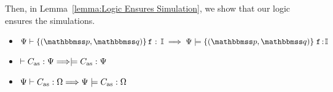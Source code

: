 
Then, in Lemma~\ref{lemma:Logic Ensures Simulation}, 
we show that our logic ensures the simulations. 

\begin{lemma}
    \em
    \label{lemma:Logic Ensures Simulation} \mbox{}
    \begin{itemize}
        \item $\wdcblk{\Cspec}{\relastP}{\relastQ}{\lab{}}{\cblk}
            \implies
            \semwfseqrel{\Cspec}{\relastP}{\relastQ}{\cblk}$
        \item $\vdash {C_{\text{as}}} : {\Psi} \Longrightarrow
            \models C_{\text{as}}:\Psi$
        \item ${\Psi} \vdash {C_{\text{as}}} : {\Omega} \Longrightarrow
            {\Psi} \models {C_{\text{as}}} : {\Omega}$
    \end{itemize}
\end{lemma}

